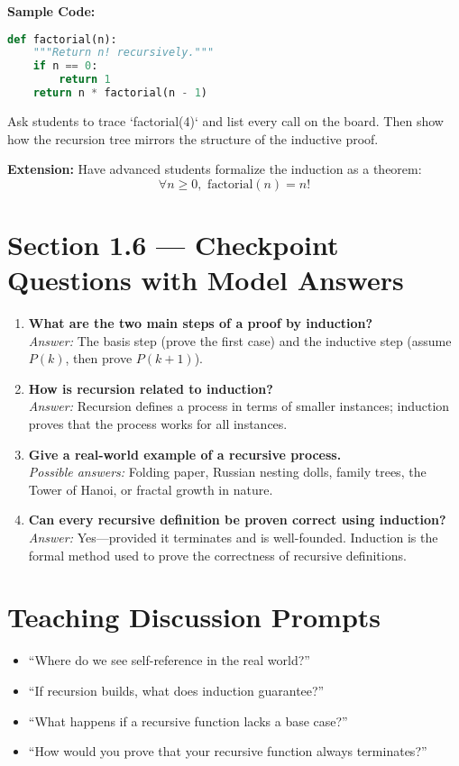 \textbf{Sample Code:}
\begin{lstlisting}[language=Python,caption={Recursive factorial function in Python},label={lst:factorial}]
def factorial(n):
    """Return n! recursively."""
    if n == 0:
        return 1
    return n * factorial(n - 1)
\end{lstlisting}

Ask students to trace `factorial(4)` and list every call on the board.  
Then show how the recursion tree mirrors the structure of the inductive proof.

\textbf{Extension:}  
Have advanced students formalize the induction as a theorem:
\[
\forall n \ge 0, \text{ factorial}(n) = n!
\]

\section{Section 1.6 — Checkpoint Questions with Model Answers}
\begin{enumerate}
  \item \textbf{What are the two main steps of a proof by induction?}\\
        \emph{Answer:} The basis step (prove the first case) and the inductive step
        (assume $P(k)$, then prove $P(k+1)$).

  \item \textbf{How is recursion related to induction?}\\
        \emph{Answer:} Recursion defines a process in terms of smaller instances;
        induction proves that the process works for all instances.

  \item \textbf{Give a real-world example of a recursive process.}\\
        \emph{Possible answers:}  
        Folding paper, Russian nesting dolls, family trees, the Tower of Hanoi,
        or fractal growth in nature.

  \item \textbf{Can every recursive definition be proven correct using induction?}\\
        \emph{Answer:} Yes—provided it terminates and is well-founded.
        Induction is the formal method used to prove the correctness of recursive definitions.
\end{enumerate}

\section{Teaching Discussion Prompts}
\begin{itemize}
  \item “Where do we see self-reference in the real world?”
  \item “If recursion builds, what does induction guarantee?”
  \item “What happens if a recursive function lacks a base case?”
  \item “How would you prove that your recursive function always terminates?”
\end{itemize}

